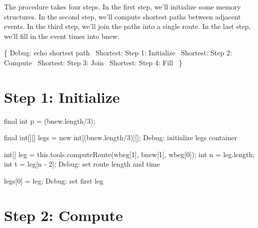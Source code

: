 The procedure takes four steps. In the first step, we'll initialize some memory
structures. In the second step, we'll compute shortest paths between adjacent
events. In the third step, we'll join the paths into a single route. In the
last step, we'll fill in the event times into {\Tt{}bnew\nwendquote}.

\nwenddocs{}\endmoddef\nwstartdeflinemarkup{}\nwenddeflinemarkup
\{
  \LA{}Debug: echo shortest path~{\nwtagstyle{}}\RA{}
  \LA{}Shortest: Step 1: Initialize~{\nwtagstyle{}}\RA{}
  \LA{}Shortest: Step 2: Compute~{\nwtagstyle{}}\RA{}
  \LA{}Shortest: Step 3: Join~{\nwtagstyle{}}\RA{}
  \LA{}Shortest: Step 4: Fill~{\nwtagstyle{}}\RA{}
\}
\nwendcode{}\nwdocspar

\section{Step 1: Initialize}

\nwenddocs{}\endmoddef\nwstartdeflinemarkup{}\nwenddeflinemarkup
final int p = (bnew.length/3);

final int[][] legs = new int[(bnew.length/3)][];
\LA{}Debug: initialize legs container~{\nwtagstyle{}}\RA{}

int[] leg = this.tools.computeRoute(wbeg[1], bnew[1], wbeg[0]);
int n = leg.length;
int t = leg[n - 2];
\LA{}Debug: set route length and time~{\nwtagstyle{}}\RA{}

legs[0] = leg;
\LA{}Debug: set first leg~{\nwtagstyle{}}\RA{}
\nwendcode{}\nwdocspar

\section{Step 2: Compute}

